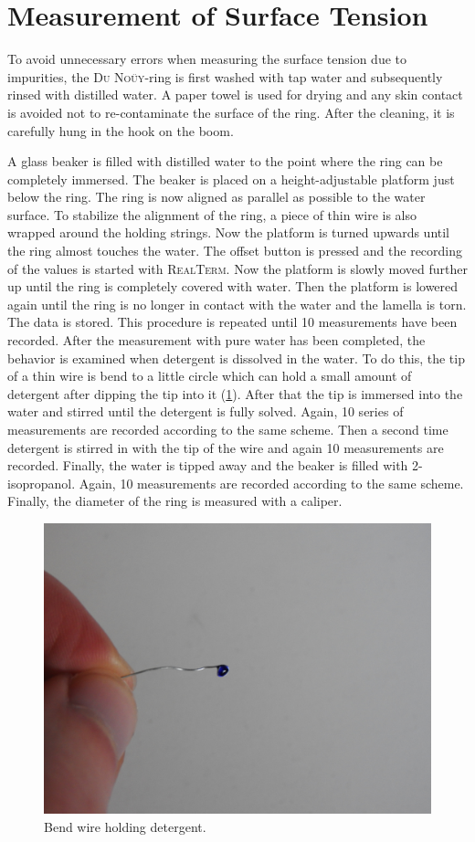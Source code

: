     \section{Measurement of Surface Tension} \label{sec:Surface_Tension}
        To avoid unnecessary errors when measuring the surface tension due to impurities, the \textsc{Du Noüy}-ring is first washed with tap
        water and subsequently rinsed with distilled water. A paper towel is used for drying and any skin contact is avoided
        not to re-contaminate the surface of the ring. After the cleaning, it is carefully hung in the hook on the boom.\par
        A glass beaker is filled with distilled water to the point where the ring can be
        completely immersed. The beaker is placed on a height-adjustable platform just below the ring. The ring is now aligned as
        parallel as possible to the water surface. To stabilize the alignment of the ring, a piece of thin wire is also wrapped
        around the holding strings. Now the platform is turned upwards until the ring almost touches the water. The offset button
        is pressed and the recording of the values is started with \textsc{RealTerm}. Now the platform is slowly moved further up
        until the ring is completely covered with water. Then the platform is lowered again until the ring is no longer in contact
        with the water and the lamella is torn. The data is stored. This procedure is repeated until 10 measurements have been
        recorded. After the measurement with pure water has been completed, the behavior is examined when detergent is dissolved
        in the water. To do this, the tip of a thin wire is bend to a little circle which can hold a small amount of detergent
        after dipping the tip into it (\cref{fig:wire_detergent}). After that the tip is immersed into the water and stirred until the detergent is fully
        solved. Again, 10 series of measurements are recorded according to the same scheme. Then a second time detergent is stirred
        in with the tip of the wire and again 10 measurements are recorded. Finally, the water is tipped away and the beaker is
        filled with 2-isopropanol. Again, 10 measurements are recorded according to the same scheme. Finally, the diameter of the
        ring is measured with a caliper.
        \begin{figure}[h]
		    \centering
		    \includegraphics[width=.8\textwidth]{aufbau/wire_detergent.jpg}
		    \caption[]{Bend wire holding detergent.}
		    \label{fig:wire_detergent}
	    \end{figure}
